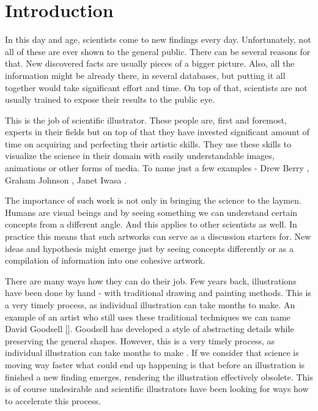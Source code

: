 \documentclass[
  digital, %
  table,   %
  nolof,     %
  nolot,     %
]{fithesis3}
\begin{document}
\chapter{Introduction}
In this day and age, scientists come to new findings every day. Unfortunately, not all of these are ever shown to the general public. %
There can be several reasons for that. New discovered facts are usually pieces of a bigger picture. Also, all the information might be already there, in several databases, but putting it all together would take significant effort and time.
On top of that, scientists are not usually trained to expose their results to the public eye.

This is the job of scientific illustrator. These people are, first and foremost, experts in their fields but on top of that they have invested significant amount of time on acquiring and perfecting their artistic skills. They use these skills to visualize the science in their domain with easily understandable images, animations or other forms of media. To name just a few examples - Drew Berry \cite{DrewBerryMovies}, Graham Johnson \cite{GrahamCellVideo}, Janet Iwasa \cite{iwasa2010animating}.

The importance of such work is not only in bringing the science to the laymen. Humans are visual beings and by seeing something we can understand certain concepts from a different angle. And this applies to other scientists as well. In practice this means that such artworks can serve as a discussion starters for. New ideas and hypothesis might emerge just by seeing concepts differently or as a compilation of information into one cohesive artwork.

There are many ways how they can do their job. Few years back, illustrations have been done by hand - with traditional drawing and painting methods. This is a very timely process, as individual illustration can take months to make. An example of an artist who still uses these traditional techniques we can name David Goodsell []. Goodsell has developed a style of abstracting details while preserving the general shapes. However, this is a very timely process, as individual illustration can take months to make \cite{DavidGoodsellVideo}. If we consider that science is moving way faster what could end up happening is that before an illustration is finished a new finding emerges, rendering the illustration effectively obsolete. This is of course undesirable and scientific illustrators have been looking for ways how to accelerate this process.
\end{document}
